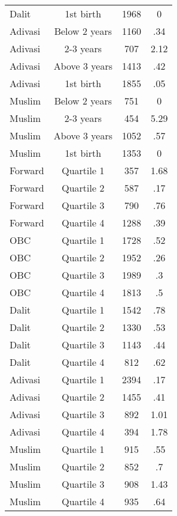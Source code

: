 \begin{tabular}{lccc}
Dalit&1st birth&1968&0\\
Adivasi&Below 2 years&1160&.34\\
Adivasi&2-3 years&707&2.12\\
Adivasi&Above 3 years&1413&.42\\
Adivasi&1st birth&1855&.05\\
Muslim&Below 2 years&751&0\\
Muslim&2-3 years&454&5.29\\
Muslim&Above 3 years&1052&.57\\
Muslim&1st birth&1353&0\\
Forward&Quartile 1&357&1.68\\
Forward&Quartile 2&587&.17\\
Forward&Quartile 3&790&.76\\
Forward&Quartile 4&1288&.39\\
OBC&Quartile 1&1728&.52\\
OBC&Quartile 2&1952&.26\\
OBC&Quartile 3&1989&.3\\
OBC&Quartile 4&1813&.5\\
Dalit&Quartile 1&1542&.78\\
Dalit&Quartile 2&1330&.53\\
Dalit&Quartile 3&1143&.44\\
Dalit&Quartile 4&812&.62\\
Adivasi&Quartile 1&2394&.17\\
Adivasi&Quartile 2&1455&.41\\
Adivasi&Quartile 3&892&1.01\\
Adivasi&Quartile 4&394&1.78\\
Muslim&Quartile 1&915&.55\\
Muslim&Quartile 2&852&.7\\
Muslim&Quartile 3&908&1.43\\
Muslim&Quartile 4&935&.64\\
\bottomrule
\end{tabular}
